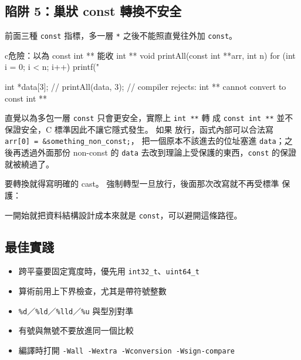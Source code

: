 
\subsection{陷阱 5：巢狀 const 轉換不安全}

前面三種 \texttt{const} 指標，多一層 \texttt{*} 之後不能照直覺往外加
\texttt{const}。

\begin{code}{c}{危險：以為 const int ** 能收 int **}
void printAll(const int **arr, int n) {
    for (int i = 0; i < n; i++) {
        printf("%
    }
}

int *data[3];
// printAll(data, 3);
// compiler rejects: int ** cannot convert to const int **
\end{code}

直覺以為多包一層 \texttt{const} 只會更安全，實際上 \texttt{int **} 轉
成 \texttt{const int **} 並不保證安全，C 標準因此不讓它隱式發生。 如果
放行，函式內部可以合法寫 \texttt{arr[0] = \&something\_non\_const;}，
把一個原本不該進去的位址塞進 \texttt{data}；之後再透過外面那份
non-const 的 \texttt{data} 去改到理論上受保護的東西，\texttt{const}
的保證就被繞過了。

要轉換就得寫明確的 cast。 強制轉型一旦放行，後面那次改寫就不再受標準
保護：


一開始就把資料結構設計成本來就是 \texttt{const}，可以避開這條路徑。

\subsection{最佳實踐}

\begin{itemize}
\item 跨平臺要固定寬度時，優先用 \texttt{int32\_t}、\texttt{uint64\_t}
\item 算術前用上下界檢查，尤其是帶符號整數
\item \texttt{\%d}／\texttt{\%ld}／\texttt{\%lld}／\texttt{\%u} 與型別對準
\item 有號與無號不要放進同一個比較
\item 編譯時打開 \texttt{-Wall -Wextra -Wconversion -Wsign-compare}
\end{itemize}

